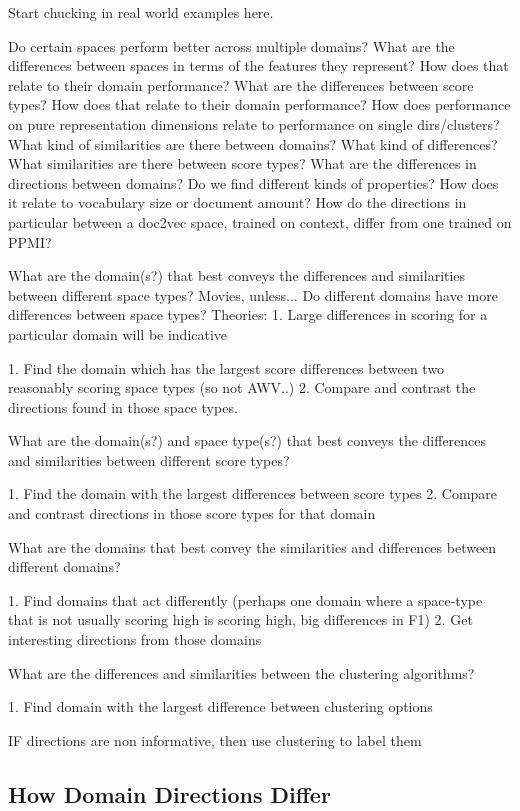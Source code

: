 Start chucking in real world examples here.

Do certain spaces perform better across multiple domains?
What are the differences between spaces in terms of the features they represent? How does that relate to their domain performance?
What are the differences between score types? How does that relate to their domain performance?
How does performance on pure representation dimensions relate to performance on single dirs/clusters?
What kind of similarities are there between domains? What kind of differences?
What similarities are there between score types?
What are the differences in directions between domains? Do we find different kinds of properties? How does it relate to vocabulary size or document amount?
How do the directions in particular between a doc2vec space, trained on context, differ from one trained on PPMI?


What are the domain(s?) that best conveys the differences and similarities between different space types?
	Movies, unless...
		Do different domains have more differences between space types? Theories:
			1. Large differences in scoring for a particular domain will be indicative
			
1. Find the domain which has the largest score differences between two reasonably scoring space types (so not AWV..)
2. Compare and contrast the directions found in those space types. 

What are the domain(s?) and space type(s?) that best conveys the differences and similarities between different score types?

1. Find the domain with the largest differences between score types
2. Compare and contrast directions in those score types for that domain

What are the domains that best convey the similarities and differences between different domains?

1. Find domains that act differently (perhaps one domain where a space-type that is not usually scoring high is scoring high, big differences in F1)
2. Get interesting directions from those domains

What are the differences and similarities between the clustering algorithms?

1. Find domain with the largest difference between clustering options

IF directions are non informative, then use clustering to label them

\subsection{How Domain Directions Differ}

